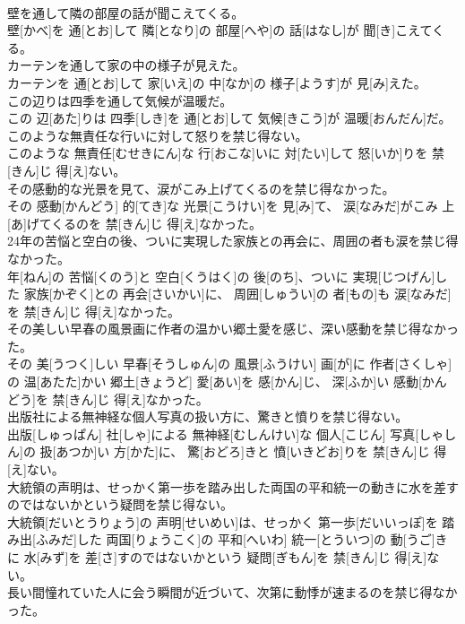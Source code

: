 \documentclass[8pt]{extreport}
\begin{document}
\begin{CJK}{UTF8}{min}
\\	壁を通して隣の部屋の話が聞こえてくる。	
\\	壁[かべ]を 通[とお]して 隣[となり]の 部屋[へや]の 話[はなし]が 聞[き]こえてくる。
\\	カーテンを通して家の中の様子が見えた。	
\\	カーテンを 通[とお]して 家[いえ]の 中[なか]の 様子[ようす]が 見[み]えた。
\\	この辺りは四季を通して気候が温暖だ。	
\\	この 辺[あた]りは 四季[しき]を 通[とお]して 気候[きこう]が 温暖[おんだん]だ。
\\	このような無責任な行いに対して怒りを禁じ得ない。	
\\	このような 無責任[むせきにん]な 行[おこな]いに 対[たい]して 怒[いか]りを 禁[きん]じ 得[え]ない。
\\	その感動的な光景を見て、涙がこみ上げてくるのを禁じ得なかった。	
\\	その 感動[かんどう] 的[てき]な 光景[こうけい]を 見[み]て、 涙[なみだ]がこみ 上[あ]げてくるのを 禁[きん]じ 得[え]なかった。
\\	24年の苦悩と空白の後、ついに実現した家族との再会に、周囲の者も涙を禁じ得なかった。	
\\	年[ねん]の 苦悩[くのう]と 空白[くうはく]の 後[のち]、ついに 実現[じつげん]した 家族[かぞく]との 再会[さいかい]に、 周囲[しゅうい]の 者[もの]も 涙[なみだ]を 禁[きん]じ 得[え]なかった。
\\	その美しい早春の風景画に作者の温かい郷土愛を感じ、深い感動を禁じ得なかった。	
\\	その 美[うつく]しい 早春[そうしゅん]の 風景[ふうけい] 画[が]に 作者[さくしゃ]の 温[あたた]かい 郷土[きょうど] 愛[あい]を 感[かん]じ、 深[ふか]い 感動[かんどう]を 禁[きん]じ 得[え]なかった。
\\	出版社による無神経な個人写真の扱い方に、驚きと憤りを禁じ得ない。	
\\	出版[しゅっぱん] 社[しゃ]による 無神経[むしんけい]な 個人[こじん] 写真[しゃしん]の 扱[あつか]い 方[かた]に、 驚[おどろ]きと 憤[いきどお]りを 禁[きん]じ 得[え]ない。
\\	大統領の声明は、せっかく第一歩を踏み出した両国の平和統一の動きに水を差すのではないかという疑問を禁じ得ない。	
\\	大統領[だいとうりょう]の 声明[せいめい]は、せっかく 第一歩[だいいっぽ]を 踏み出[ふみだ]した 両国[りょうこく]の 平和[へいわ] 統一[とういつ]の 動[うご]きに 水[みず]を 差[さ]すのではないかという 疑問[ぎもん]を 禁[きん]じ 得[え]ない。
\\	長い間憧れていた人に会う瞬間が近づいて、次第に動悸が速まるのを禁じ得なかった。	

\end{CJK}
\end{document}
